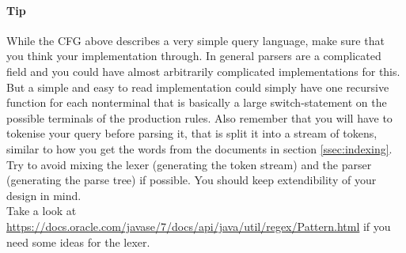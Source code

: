 \documentclass[11pt]{article}
\begin{document}
\paragraph{Tip} While the CFG above describes a very simple query language, make sure that you think your implementation through. In general parsers are a complicated field and you could have almost arbitrarily complicated implementations for this. But a simple and easy to read implementation could simply have one recursive function for each nonterminal that is basically a large switch-statement on the possible terminals of the production rules. Also remember that you will have to tokenise your query before parsing it, that is split it into a stream of tokens, similar to how you get the words from the documents in section \ref{ssec:indexing}. Try to avoid mixing the lexer (generating the token stream) and the parser (generating the parse tree) if possible. You should keep extendibility of your design in mind.\\
Take a look at \url{https://docs.oracle.com/javase/7/docs/api/java/util/regex/Pattern.html} if you need some ideas for the lexer.
\end{document}
